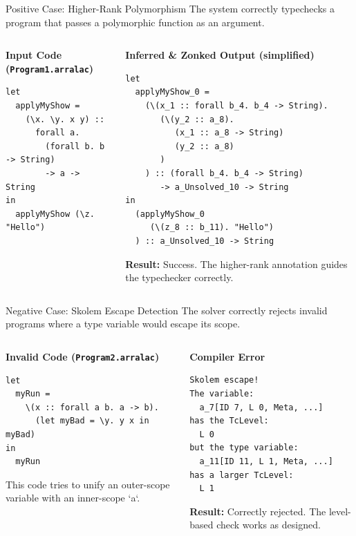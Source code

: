 \documentclass[serif, aspectratio=169]{beamer}
\begin{document}
\begin{frame}[containsverbatim]{Positive Case: Higher-Rank Polymorphism}
  The system correctly typechecks a program that passes a polymorphic function as an argument.
  \begin{columns}[T]
    \begin{column}{0.48\textwidth}
      \textbf{Input Code (\texttt{Program1.arralac})}
      \begin{verbatim}
let
  applyMyShow =
    (\x. \y. x y) ::
      forall a.
        (forall b. b -> String)
        -> a -> String
in
  applyMyShow (\z. "Hello")
        \end{verbatim}
    \end{column}
    \begin{column}{0.5\textwidth}
      \textbf{Inferred \& Zonked Output (simplified)}
      \begin{verbatim}
let
  applyMyShow_0 =
    (\(x_1 :: forall b_4. b_4 -> String).
       (\(y_2 :: a_8).
          (x_1 :: a_8 -> String) 
          (y_2 :: a_8)
       )
    ) :: (forall b_4. b_4 -> String)
       -> a_Unsolved_10 -> String
in
  (applyMyShow_0
     (\(z_8 :: b_11). "Hello")
  ) :: a_Unsolved_10 -> String
        \end{verbatim}
      \textbf{Result:} Success. The higher-rank annotation guides the typechecker correctly.
    \end{column}
  \end{columns}
\end{frame}

\begin{frame}[containsverbatim]{Negative Case: Skolem Escape Detection}
  The solver correctly rejects invalid programs where a type variable would escape its scope.
  \begin{columns}[T]
    \begin{column}{0.48\textwidth}
      \textbf{Invalid Code (\texttt{Program2.arralac})}
      \begin{verbatim}
let 
  myRun = 
    \(x :: forall a b. a -> b). 
      (let myBad = \y. y x in myBad)
in
  myRun
        \end{verbatim}
      This code tries to unify an outer-scope variable with an inner-scope `a`.
    \end{column}
    \begin{column}{0.5\textwidth}
      \textbf{Compiler Error}
      \begin{verbatim}
Skolem escape!
The variable:
  a_7[ID 7, L 0, Meta, ...]
has the TcLevel:
  L 0
but the type variable:
  a_11[ID 11, L 1, Meta, ...]
has a larger TcLevel:
  L 1
        \end{verbatim}
      \textbf{Result:} Correctly rejected. The level-based check works as designed.
    \end{column}
  \end{columns}
\end{frame}
\end{document}
